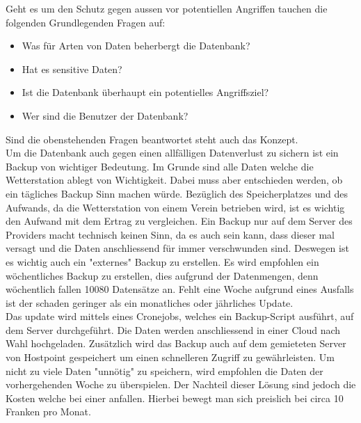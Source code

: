 Geht es um den Schutz gegen aussen vor potentiellen Angriffen tauchen die folgenden Grundlegenden Fragen auf: 
\begin{itemize}
\item Was für Arten von Daten beherbergt die Datenbank?
\item Hat es sensitive Daten?
\item Ist die Datenbank überhaupt ein potentielles Angriffsziel?
\item Wer sind die Benutzer der Datenbank?
\end{itemize}
Sind die obenstehenden Fragen beantwortet steht auch das Konzept.\\
Um die Datenbank auch gegen einen allfälligen Datenverlust zu sichern ist ein Backup von wichtiger Bedeutung. Im Grunde sind alle Daten welche die Wetterstation ablegt von Wichtigkeit. Dabei muss aber entschieden werden, ob ein tägliches Backup Sinn machen würde. Bezüglich des Speicherplatzes und des Aufwands, da die Wetterstation von einem Verein betrieben wird, ist es wichtig den Aufwand mit dem Ertrag zu vergleichen. Ein Backup nur auf dem Server des Providers macht technisch keinen Sinn, da es auch sein kann, dass dieser mal versagt und die Daten anschliessend für immer verschwunden sind. Deswegen ist es wichtig auch ein "externes" Backup zu erstellen. Es wird empfohlen ein wöchentliches Backup zu erstellen, dies aufgrund der Datenmengen, denn wöchentlich fallen 10080 Datensätze an. Fehlt eine Woche aufgrund eines Ausfalls ist der schaden geringer als ein monatliches oder jährliches Update.\\
Das update wird mittels eines Cronejobs, welches ein Backup-Script ausführt, auf dem Server durchgeführt. Die Daten werden anschliessend in einer Cloud nach Wahl hochgeladen. Zusätzlich wird das Backup auch auf dem gemieteten Server von Hostpoint gespeichert um einen schnelleren Zugriff zu gewährleisten. Um nicht zu viele Daten "unnötig" zu speichern, wird empfohlen die Daten der vorhergehenden Woche zu überspielen. Der Nachteil dieser Lösung sind jedoch die Kosten welche bei einer  anfallen. Hierbei bewegt man sich preislich bei circa 10 Franken pro Monat.

